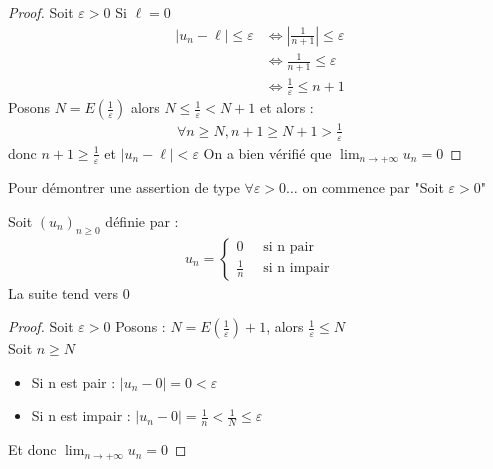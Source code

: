     \begin{proof}
    Soit $\varepsilon > 0$ 
	Si $\ell = 0$
	\begin{align*}
	|u_n - \ell| \leqslant \varepsilon &\iff \left| \frac{1}{n+1} \right| \leqslant \varepsilon \\
	&\iff \frac{1}{n+1} \leqslant \varepsilon \\
	&\iff \frac{1}{\varepsilon} \leqslant n + 1
	\end{align*}
    Posons $N = E(\frac{1}{\varepsilon})$ alors $N \leqslant \frac{1}{\varepsilon} < N + 1$
    et alors : 
    \begin{align*}
        \forall n \geqslant N, n + 1 \geqslant N + 1 > \frac{1}{\varepsilon}
    \end{align*}
    donc $n + 1 \geqslant \frac{1}{\varepsilon}$ et $|u_n - \ell| < \varepsilon$
    On a bien vérifié que $\displaystyle{\lim_{n \to +\infty} u_n = 0}$
    \end{proof}


    \begin{remarque}
    Pour démontrer une assertion de type $\forall \varepsilon > 0 \ldots$ on commence par "Soit $\varepsilon > 0$" 
\end{remarque}



    \begin{exemple}
    Soit $(u_n)_{n \geqslant 0}$ définie par :
    \begin{align*}
        u_n =
        \begin{cases}
            0 \ &\text{ si n pair } \\
            \frac{1}{n} \ &\text{ si n impair}
        \end{cases}
    \end{align*}
    La suite tend vers 0
    \begin{proof}
        Soit $\varepsilon > 0$
        Posons : $N = E \left(\frac{1}{\varepsilon} \right) + 1$, alors $\frac{1}{\varepsilon} \leqslant N$
        \\
        Soit $n \geqslant N$
        \begin{itemize}
            \item Si n est pair : $\left| u_n - 0 \right| = 0 < \varepsilon$
            \item Si n est impair : $\left|u_n - 0 \right| = \frac{1}{n} < \frac{1}{N} \leqslant \varepsilon$
        \end{itemize}
        Et donc $\displaystyle{\lim_{n \to +\infty} u_n = 0}$
    \end{proof}
\end{exemple}

